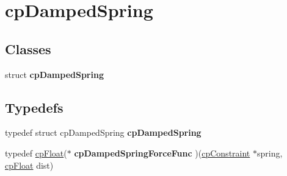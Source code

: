 \hypertarget{group__cp_damped_spring}{\section{cp\-Damped\-Spring}
\label{group__cp_damped_spring}
}
\subsection*{Classes}
\begin{DoxyCompactItemize}
\item 
struct {\bfseries cp\-Damped\-Spring}
\end{DoxyCompactItemize}
\subsection*{Typedefs}
\begin{DoxyCompactItemize}
\item 
\hypertarget{group__cp_damped_spring_gab4c3629bf0daa6e27aaff6ac1bdc0fb7}{typedef struct cp\-Damped\-Spring {\bfseries cp\-Damped\-Spring}}\label{group__cp_damped_spring_gab4c3629bf0daa6e27aaff6ac1bdc0fb7}

\item 
\hypertarget{group__cp_damped_spring_gadb36cc6401c8dcc249d067330ac1a57c}{typedef \hyperlink{group__basic_types_gac1ed65573e035bf892505768c852d8d3}{cp\-Float}($\ast$ {\bfseries cp\-Damped\-Spring\-Force\-Func} )(\hyperlink{structcp_constraint}{cp\-Constraint} $\ast$spring, \hyperlink{group__basic_types_gac1ed65573e035bf892505768c852d8d3}{cp\-Float} dist)}\label{group__cp_damped_spring_gadb36cc6401c8dcc249d067330ac1a57c}

\end{DoxyCompactItemize}
